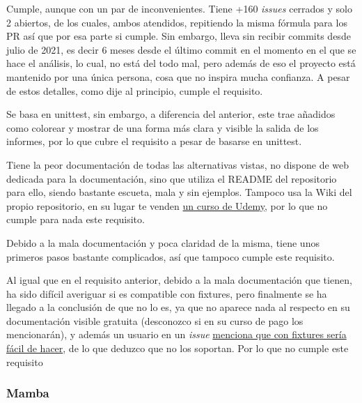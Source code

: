 \begin{todolist}
    \item[\xcmark] Cumple, aunque con un par de inconvenientes. Tiene +160 \emph{issues}
    cerrados y solo 2 abiertos, de los cuales, ambos atendidos, repitiendo la
    misma fórmula para los PR así que por esa parte si cumple. Sin embargo,
    lleva sin recibir commits desde julio de 2021, es decir 6 meses desde el
    último commit en el momento en el que se hace el análisis, lo cual, no está
    del todo mal, pero además de eso el proyecto está mantenido por una única
    persona, cosa que no inspira mucha confianza. A pesar de estos detalles, como
    dije al principio, cumple el requisito.
    \item[\xcmark] Se basa en unittest, sin embargo, a diferencia del anterior, este
    trae añadidos como colorear y mostrar de una forma más clara y visible la
    salida de los informes, por lo que cubre el requisito a pesar de basarse en
    unittest.
    \item Tiene la peor documentación de todas las alternativas vistas, no
    dispone de web dedicada para la documentación, sino que utiliza el README
    del repositorio para ello, siendo bastante escueta, mala y sin ejemplos.
    Tampoco usa la Wiki del propio repositorio, en su lugar te venden
    \href{https://www.udemy.com/course/python-testing-with-green/}{un curso de
    Udemy}, por lo que no cumple para nada este requisito.
    \item Debido a la mala documentación y poca claridad de la misma, tiene unos
    primeros pasos bastante complicados, así que tampoco cumple este requisito.
    \item Al igual que en el requisito anterior, debido a la mala documentación
    que tienen, ha sido difícil averiguar si es compatible con fixtures,
    pero finalmente se ha llegado a la conclusión de que no lo es, ya que no
    aparece nada al respecto en su documentación visible gratuita (desconozco si
    en su curso de pago los mencionarán), y además un usuario en un \emph{issue}
    \href{https://github.com/CleanCut/green/issues/60#issuecomment-112241525}{menciona
    que con fixtures sería fácil de hacer}, de lo que deduzco que no los
    soportan. Por lo que no cumple este requisito
\end{todolist}


\subsubsection{Mamba}

